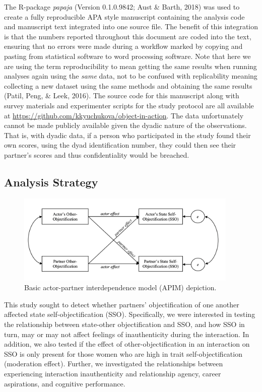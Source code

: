 \documentclass[man]{apa6}
\begin{document}
The R-package \emph{papaja} (Version 0.1.0.9842; Aust \& Barth, 2018)
was used to create a fully reproducible APA style manuscript containing
the analysis code and manuscript text integrated into one source file.
The benefit of this integration is that the numbers reported throughout
this document are coded into the text, ensuring that no errors were made
during a workflow marked by copying and pasting from statistical
software to word processing software. Note that here we are using the
term reproducibility to mean getting the same results when running
analyses again using the \emph{same} data, not to be confused with
replicability meaning collecting a new dataset using the same methods
and obtaining the same results (Patil, Peng, \& Leek, 2016). The source
code for this manuscript along with survey materials and experimenter
scripts for the study protocol are all available at
\url{https://github.com/kkyuchukova/object-in-action}. The data
unfortunately cannot be made publicly available given the dyadic nature
of the observations. That is, with dyadic data, if a person who
participated in the study found their own scores, using the dyad
identification number, they could then see their partner's scores and
thus confidentiality would be breached.

\subsection{Analysis Strategy}\label{analysis-strategy}

\begin{figure}
\includegraphics[width=400px]{figures/APIM_figure} \caption{Basic actor-partner interdependence model (APIM) depiction.}\label{fig:apim}
\end{figure}

This study sought to detect whether partners' objectification of one
another affected state self-objectification (SSO). Specifically, we were
interested in testing the relationship between state-other
objectification and SSO, and how SSO in turn, may or may not affect
feelings of inauthenticity during the interaction. In addition, we also
tested if the effect of other-objectification in an interaction on SSO
is only present for those women who are high in trait
self-objectification (moderation effect). Further, we investigated the
relationships between experiencing interaction inauthenticity and
relationship agency, career aspirations, and cognitive performance.
\end{document}
